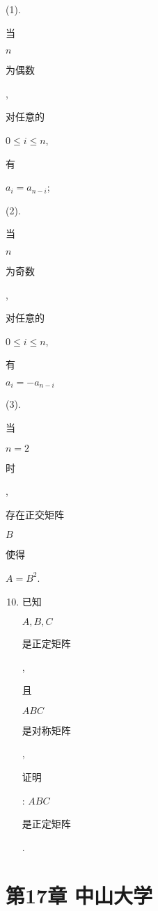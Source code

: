 \documentclass[10pt]{article}
\begin{document}
(1). \begin{CJK}{UTF8}{mj}当\end{CJK} $n$ \begin{CJK}{UTF8}{mj}为偶数\end{CJK}, \begin{CJK}{UTF8}{mj}对任意的\end{CJK} $0 \leqslant i \leq n$, \begin{CJK}{UTF8}{mj}有\end{CJK} $a_{i}=a_{n-i}$;

(2). \begin{CJK}{UTF8}{mj}当\end{CJK} $n$ \begin{CJK}{UTF8}{mj}为奇数\end{CJK}, \begin{CJK}{UTF8}{mj}对任意的\end{CJK} $0 \leqslant i \leqslant n$, \begin{CJK}{UTF8}{mj}有\end{CJK} $a_{i}=-a_{n-i}$

(3). \begin{CJK}{UTF8}{mj}当\end{CJK} $n=2$ \begin{CJK}{UTF8}{mj}时\end{CJK}, \begin{CJK}{UTF8}{mj}存在正交矩阵\end{CJK} $B$ \begin{CJK}{UTF8}{mj}使得\end{CJK} $A=B^{2}$.

\begin{enumerate}
  \setcounter{enumi}{9}
  \item \begin{CJK}{UTF8}{mj}已知\end{CJK} $A, B, C$ \begin{CJK}{UTF8}{mj}是正定矩阵\end{CJK}, \begin{CJK}{UTF8}{mj}且\end{CJK} $A B C$ \begin{CJK}{UTF8}{mj}是对称矩阵\end{CJK}, \begin{CJK}{UTF8}{mj}证明\end{CJK}: $A B C$ \begin{CJK}{UTF8}{mj}是正定矩阵\end{CJK}.
\end{enumerate}
\section{第17章 中山大学}
\end{document}
